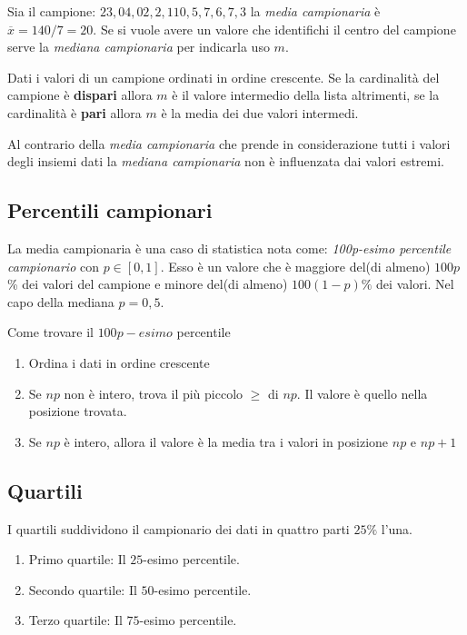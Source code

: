 \documentclass{article}
\begin{document}
Sia il campione: $23,04,02,2,110,5,7,6,7,3$ la \textit{media campionaria} è $\overline{x} = 140/7=20$. Se si vuole avere un valore che identifichi il centro del campione serve la \textit{mediana campionaria} per indicarla uso $m$.

\begin{tcolorbox}
 Dati i valori di un campione ordinati in ordine crescente. Se la cardinalità del campione è \textbf{dispari} allora $m$ è il valore intermedio della lista altrimenti, se la cardinalità è \textbf{pari} allora $m$ è la media dei due valori intermedi.  
\end{tcolorbox}

Al contrario della \textit{media campionaria} che prende in considerazione tutti i valori degli insiemi dati la \textit{mediana campionaria} non è influenzata dai valori estremi.

\subsection*{Percentili campionari}

La media campionaria è una caso di statistica nota come: \textit{100p-esimo percentile campionario} con $p \in [0,1]$. Esso è un valore che è maggiore del(di almeno) $100p$\% dei valori del campione e minore del(di almeno) $100(1-p)\%$ dei valori. Nel capo della mediana $p=0,5$.

\begin{tcolorbox}
Come trovare il $100p-esimo$ percentile
  \begin{enumerate}
    \item Ordina i dati in ordine crescente
    \item Se $np$ non è intero, trova il più piccolo $\ge$ di $np$. Il valore è quello nella posizione trovata.
    \item Se $np$ è intero, allora il valore è la media tra i valori in posizione $np$ e $np+1$
  \end{enumerate}  
\end{tcolorbox}

\subsection*{Quartili}

I quartili suddividono il campionario dei dati in quattro parti $25\%$ l'una.

\begin{enumerate}
  \item Primo quartile: Il $25$-esimo percentile.
  \item Secondo quartile: Il $50$-esimo percentile.
  \item Terzo quartile: Il $75$-esimo percentile.
\end{enumerate}
\end{document}
